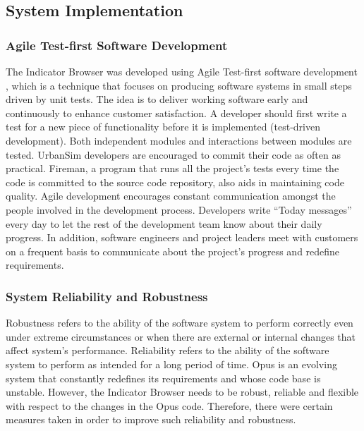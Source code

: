 
\subsection{System Implementation}
\label{sec:implementation}

\subsubsection{Agile Test-first Software Development}

The Indicator Browser was developed using Agile Test-first software
development \cite{cockburn-book-2002}, which is a technique that focuses on
producing software systems in small steps driven by unit tests. The
idea is to deliver working software early and continuously to enhance
customer satisfaction. A developer should first write a test for a new piece
of functionality before it is implemented (test-driven development).  
Both independent modules and interactions between modules
are tested.  UrbanSim developers are encouraged to commit their code as
often as practical.  Fireman, a program that runs all the project's tests
every time the code is committed
to the source code repository, also aids in maintaining code quality.
Agile development encourages constant communication amongst the people
involved in the development process.  Developers write ``Today
messages'' \cite{brush-hicss-2005} every day to let the rest of the
development team know about their daily progress. In addition, software
engineers and project leaders meet with customers on a frequent basis to
communicate about the project's progress and redefine requirements.

\subsubsection{System Reliability and Robustness}

Robustness refers to the ability of the software system to perform
correctly even under extreme circumstances or when there are external or
internal changes that affect system's performance. Reliability refers to
the ability of the software system to perform as intended for a long
period of time.  Opus is an evolving system that constantly redefines its
requirements and whose code base is unstable.  However, the Indicator
Browser needs to be robust, reliable and flexible with respect to the
changes in the Opus code. Therefore, there were certain measures taken in
order to improve such reliability and robustness.

